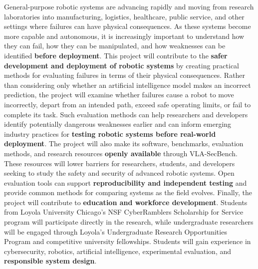 General-purpose robotic systems are advancing rapidly and moving from research laboratories into manufacturing, logistics, healthcare, public service, and other settings where failures can have physical consequences. As these systems become more capable and autonomous, it is increasingly important to understand how they can fail, how they can be manipulated, and how weaknesses can be identified \textbf{before deployment}.
This project will contribute to the \textbf{safer development and deployment of robotic systems} by creating practical methods for evaluating failures in terms of their physical consequences. Rather than considering only whether an artificial intelligence model makes an incorrect prediction, the project will examine whether failures cause a robot to move incorrectly, depart from an intended path, exceed safe operating limits, or fail to complete its task. Such evaluation methods can help researchers and developers identify potentially dangerous weaknesses earlier and can inform emerging industry practices for \textbf{testing robotic systems before real-world deployment}.
The project will also make its software, benchmarks, evaluation methods, and research resources \textbf{openly available} through VLA-SecBench. These resources will lower barriers for researchers, students, and developers seeking to study the safety and security of advanced robotic systems. Open evaluation tools can support \textbf{reproducibility and independent testing} and provide common methods for comparing systems as the field evolves.
Finally, the project will contribute to \textbf{education and workforce development}. Students from Loyola University Chicago's NSF CyberRamblers Scholarship for Service program will participate directly in the research, while undergraduate researchers will be engaged through Loyola's Undergraduate Research Opportunities Program and competitive university fellowships. Students will gain experience in cybersecurity, robotics, artificial intelligence, experimental evaluation, and \textbf{responsible system design}.



